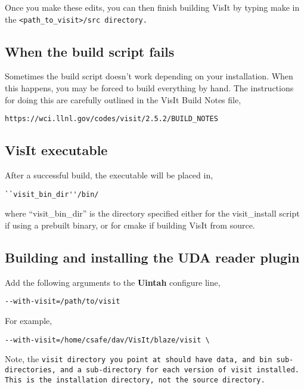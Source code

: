 \documentclass[11pt,fleqn]{book} %
\begin{document}
\normalfont Once you make these edits, you can then finish building VisIt by typing make in the \tt <path\_to\_visit>/src \normalfont directory.  

\subsection{When the build script fails}
\label{sec:WhenTheBuildsSriptFails}

Sometimes the build script doesn't work depending on your
installation. When this happens, you may be forced to build everything
by hand. The instructions for doing this are carefully outlined in the
VisIt Build Notes file,

\begin{lstlisting}
https://wci.llnl.gov/codes/visit/2.5.2/BUILD_NOTES
\end{lstlisting}

\subsection{VisIt executable}
\label{sec:VisItExecutable}

After a successful build, the executable will be placed in,

\begin{lstlisting}
``visit_bin_dir''/bin/
\end{lstlisting}

where ``visit\_bin\_dir'' is the directory specified either for the
visit\_install script if using a prebuilt binary, or for cmake if
building VisIt from source.

\subsection{Building and installing the UDA reader plugin}
\label{sec:BuildingAndInstallingUDAPlugin}

Add the following arguments to the \textbf{Uintah} configure line,

\begin{lstlisting}
--with-visit=/path/to/visit
\end{lstlisting}

For example,

\begin{lstlisting}
--with-visit=/home/csafe/dav/VisIt/blaze/visit \
\end{lstlisting}

Note, the \tt visit \normalfont directory you point at should
have \tt data\normalfont , and \tt bin \normalfont sub-directories,
and a sub-directory for each version of visit installed.  This is the
installation directory, not the source directory.
\end{document}
